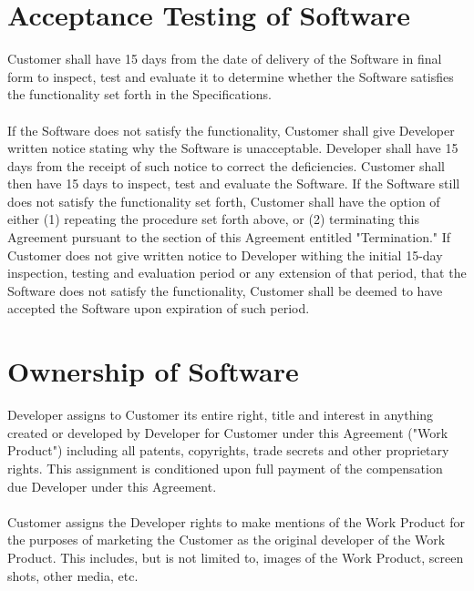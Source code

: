 \documentclass[11pt]{article}
\begin{document}
\section{Acceptance Testing of Software}
Customer shall have 15 days from the date of delivery of the Software in final form to inspect, test and evaluate it to determine whether the Software satisfies the functionality set forth in the Specifications.\\ \\
If the Software does not satisfy the functionality, Customer shall give Developer written notice stating why the Software is unacceptable. Developer shall have 15 days from the receipt of such notice to correct the deficiencies. Customer shall then have 15 days to inspect, test and evaluate the Software. If the Software still does not satisfy the functionality set forth, Customer shall have the option of either (1) repeating the procedure set forth above, or (2) terminating this Agreement pursuant to the section of this Agreement entitled "Termination." If Customer does not give written notice to Developer withing the initial 15-day inspection, testing and evaluation period or any extension of that period, that the Software does not satisfy the functionality, Customer shall be deemed to have accepted the Software upon expiration of such period.
\section{Ownership of Software}
Developer assigns to Customer its entire right, title and interest in anything created or developed by Developer for Customer under this Agreement ("Work Product") including all patents, copyrights, trade secrets and other proprietary rights. This assignment is conditioned upon full payment of the compensation due Developer under this Agreement. \\\\
Customer assigns the Developer rights to make mentions of the Work Product for the purposes of marketing the Customer as the original developer of the Work Product. This includes, but is not limited to, images of the Work Product, screen shots, other media, etc.
\end{document}
